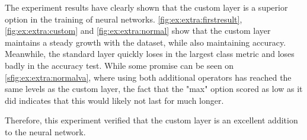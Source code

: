 The experiment results have clearly shown that the custom layer is a superior option in the training of neural networks.
\cref{fig:ex:extra:firstresult}, \cref{fig:ex:extra:custom} and \cref{fig:ex:extra:normal} show that the custom layer maintains a steady growth with the dataset, while also maintaining accuracy.
Meanwhile, the standard layer quickly loses in the largest class metric and loses badly in the accuracy test.
While some promise can be seen on \cref{sfig:ex:extra:normalva}, where using both additional operators has reached the same levels as the custom layer, the fact that the "max" option scored as low as it did indicates that this would likely not last for much longer.

Therefore, this experiment verified that the custom layer is an excellent addition to the neural network.

